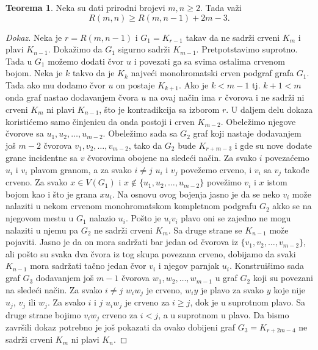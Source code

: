 \documentclass{article}
\theoremstyle{definition}
\newtheorem{teorema}{Teorema}[section]
\newcommand{\dokaz}[1]{\begin{proof}[Dokaz]#1\end{proof}}
\begin{document}
	\begin{teorema}\label{dot4}
		Neka su dati prirodni brojevi $m, n \geq 2$. Tada važi $$R(m,n) \geq R(m,n-1) + 2m - 3.$$
		\dokaz{
			Neka je $r = R(m, n - 1)$ i $G_1 = K_{r - 1}$ takav da ne sadrži crveni $K_m$ i plavi $K_{n-1}$. Dokažimo da $G_1$ sigurno sadrži $K_{m - 1}$.
			Pretpotstavimo suprotno. Tada u $G_1$ možemo dodati čvor $u$ i povezati ga sa svima ostalima crvenom bojom. Neka je $k$ takvo da je $K_k$
			najveći monohromatski crven podgraf grafa $G_1$. Tada ako mu dodamo čvor $u$ on postaje $K_{k + 1}$. Ako je $k < m - 1$ tj. $k + 1< m$ 				onda graf nastao dodavanjem čvora $u$ na ovaj način ima $r$ čvorova i ne sadrži ni crveni $K_m$ ni plavi $K_{n - 1}$, što je kontradikcija sa 				izborom $r$. \newline
			U daljem delu dokaza koristićemo samo činjenicu da onda postoji i crven $K_{m - 2}$. Obeležimo njegove čvorove sa $u_1, u_2, \dots,u_{m - 2}$.
			Obeležimo sada sa $G_2$ graf koji nastaje dodavanjem još $m - 2$ čvorova $v_1, v_2, \dots,v_{m - 2}$, tako da $G_2$ bude $K_{r + m - 3}$ i 
			gde su nove dodate grane incidentne sa $v$ čvorovima obojene na sledeći način.
			Za svako $i$ povezaćemo $u_i$ i $v_i$ plavom granom, a za svako $i \neq j$ $u_i$ i $v_j$ povežemo crveno, i $v_i$ sa $v_j$ takođe crveno.
			Za svako $x \in V(G_1)$ i $x \notin \{u_1, u_2, \dots,u_{m - 2}\}$ povežimo $v_i$ i $x$ istom bojom kao i što je grana $xu_i$. Na osnovu ovog 
			bojenja jasno je da se neko $v_i$ može nalaziti u nekom crvenom monohromatskom kompletnom podgrafu $G_2$ akko se na njegovom mestu
			u $G_1$ nalazio $u_i$. Pošto je $u_i v_i$ plavo oni se zajedno ne mogu nalaziti u njemu pa $G_2$ ne sadrži crveni $K_m$. Sa druge strane se
			$K_{n - 1}$ može pojaviti. Jasno je da on mora sadržati bar jedan od čvorova iz $\{v_1, v_2, \dots,v_{m - 2}\}$, ali pošto su svaka dva čvora iz
			tog skupa povezana crveno, dobijamo da svaki $K_{n - 1}$ mora sadržati tačno jedan čvor $v_i$ i njegov parnjak $u_i$. \newline
			Konstruišimo sada graf $G_3$ dodavanjem još $m - 1$ čvorova $w_1, w_2, \dots, w_{m - 1}$ u graf $G_2$ koji su povezani na 						sledeći način. Za svako $i \neq j$ $w_i w_j$ je crveno, $w_i y$ je plavo za svako $y$ koje nije $u_j$, $v_j$ ili $w_j$. Za svako $i$ i $j$ $u_i w_j$
			je crveno za $i \geq j$, dok je u suprotnom plavo. Sa druge strane bojimo $v_i w_j$ crveno za $i < j$, a u suprotnom u plavo. Da bismo završili
			dokaz potrebno je još pokazati da ovako dobijeni graf $G_3 = K_{r + 2m - 4}$ ne sadrži crveni $K_m$ ni plavi $K_n$. \newline
}
\end{teorema}
\end{document}
